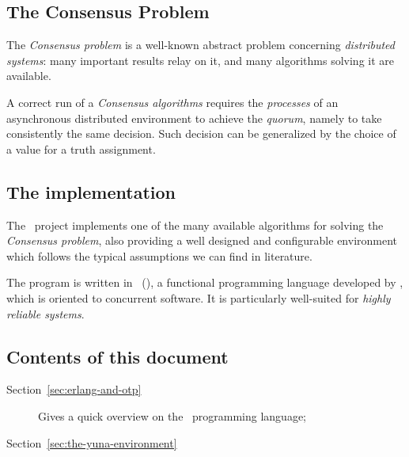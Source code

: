 \subsection{The Consensus Problem}

The \emph{Consensus problem} is a well-known abstract problem concerning
\emph{distributed systems}: many important results relay on it, and many
algorithms solving it are available.

A correct run of a \emph{Consensus algorithms} requires the
\emph{processes} of an asynchronous distributed environment to achieve the
\emph{quorum}, namely to take consistently the same decision. Such
decision can be generalized by the choice of a value for a truth
assignment.


\subsection{The implementation}

The \YUNA\ project implements one of the many available algorithms for
solving the \emph{Consensus problem}, also providing a well designed and
configurable environment which follows the typical assumptions we can find in
literature.

The program is written in \Erlang\ (), a functional
programming language developed by , which is oriented to
concurrent software. It is particularly well-suited for \emph{highly
reliable systems}.


\subsection{Contents of this document}

\begin{description}

    \item[Section~\ref{sec:erlang-and-otp}] Gives a quick overview on the
        \Erlang\ programming language;

    \item[Section~\ref{sec:the-yuna-environment}]

\end{description}
